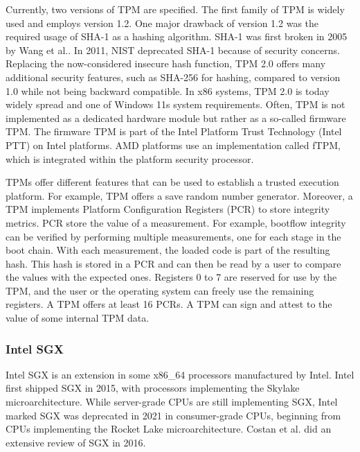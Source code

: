 Currently, two versions of TPM are specified. The first family of TPM is widely used and employs version 1.2. One major drawback
of version 1.2 was the required usage of SHA-1 as a hashing algorithm. SHA-1 was first broken in 2005 by Wang
et al.\cite{wang2005collision}. In 2011, NIST deprecated SHA-1 because of security concerns. Replacing the now-considered
insecure hash function, TPM 2.0 offers many additional security features, such as SHA-256 for hashing,
compared to version 1.0 while not being backward compatible. In x86 systems, TPM 2.0 is today widely spread and one of
Windows 11s system requirements. Often, TPM is not implemented as a dedicated hardware module but rather as a so-called
firmware TPM. The firmware TPM is part of the Intel Platform Trust Technology (Intel PTT) on Intel platforms. AMD
platforms use an implementation called fTPM, which is integrated within the platform security processor.\cite{pirker2024brief}

TPMs offer different features that can be used to establish a trusted execution platform. For example, TPM offers a save random number
generator. Moreover, a TPM implements Platform Configuration Registers (PCR) to store integrity metrics.
PCR store the value of a measurement. For example, bootflow integrity can be verified by performing multiple measurements,
one for each stage in the boot chain. With each measurement, the loaded code is part of the resulting hash. This hash is
stored in a PCR and can then be read by a user to compare the values with the expected ones. Registers 0 to 7 are
reserved for use by the TPM, and the user or the operating system can freely use the remaining registers. A TPM offers
at least 16 PCRs.
A TPM can sign and attest to the value of some internal TPM data.

\subsubsection{Intel SGX}
\label{sec:20:sgx}
Intel SGX is an extension in some x86\_64 processors manufactured by Intel. Intel first shipped SGX in 2015, with
processors implementing the Skylake microarchitecture. While server-grade CPUs are still implementing SGX, Intel marked
SGX was deprecated in 2021 in consumer-grade CPUs, beginning from CPUs implementing the Rocket Lake microarchitecture.
Costan et al. did an extensive review of SGX in 2016.\cite{costan2016intel}

